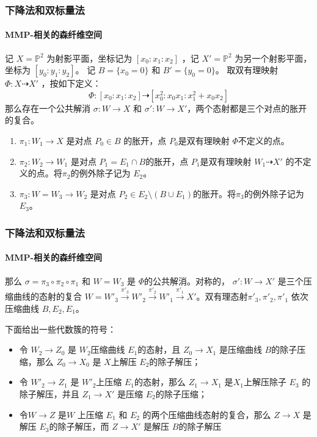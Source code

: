\documentclass[10pt]{ctexbeamer}
\begin{document}
\begin{frame}[shrink]
  \frametitle{下降法和双标量法}
  \framesubtitle{MMP-相关的森纤维空间}
记 $ X=\mathbb{P}^2 $ 为射影平面，坐标记为 $ [ x_0:x_1:x_2 ] $ ，记 $ X'=\mathbb{P}^2 $ 为另一个射影平面，坐标为 $ [ y_0:y_1:y_2 ] $。
记 $ B=\{x_0=0\} $ 和 $B'=\{y_{0}=0\} $。
取双有理映射 $ \Phi:X\dashrightarrow X' $ ，按如下定义：
\[ \Phi:[x_0:x_1:x_2]\dashrightarrow [x_0^2:x_0x_1:x_1^2+x_0x_2] \]
那么存在一个公共解消 $\sigma: W\to X$ 和 $\sigma':W\to X'$，两个态射都是三个对点的胀开的复合。

  \pause
\begin{enumerate}
  \item $\pi_{1}:W_{1}\to X$ 是对点 $P_{0} \in B$ 的胀开，点 $P_{0}$是双有理映射  $\Phi$不定义的点。
  \item $\pi_{2}:W_{2}\to W_{1}$ 是对点 $P_{1}=E_{1} \cap B$的胀开，点 $P_{1}$是双有理映射 $  W_{1}\dashrightarrow X' $
的不定义的点。将$\pi_{2}$的例外除子记为 $E_{2}$。
  \item $\pi_{3}:W=W_{3}\to W_{2}$ 是对点 $P_{2} \in E_{2} \setminus (B\cup E_{1})$的胀开。将$\pi_{3}$的例外除子记为 $E_{3}$。
\end{enumerate}
\end{frame}

\begin{frame}[shrink]
  \frametitle{下降法和双标量法}
  \framesubtitle{MMP-相关的森纤维空间}
那么 $ \sigma=\pi_{3}\circ \pi_{2} \circ \pi_{1} $ 和 $ W=W_3 $ 是 $\Phi$的公共解消。对称的， $ \sigma':W\to X' $ 是三个压缩曲线的态射的复合  $W=W'_{3}\xrightarrow{\pi'_{3}} W'_{2}\xrightarrow{\pi'_{2}} W'_{1} \xrightarrow{\pi'_{1}} X'$。双有理态射$\pi'_{3},\pi'_{2},\pi'_{1}$ 依次压缩曲线 $ B,E_2,E_1 $。

  \pause
下面给出一些代数簇的符号：
\begin{itemize}
  \item 令 $W_{2}\to Z_{0}$ 是  $W_{2}$压缩曲线 $E_{1}$的态射，且 $Z_{0} \to X_{1}$ 是压缩曲线 $B$的除子压缩，那么 $Z_{0}\to X_{0}$ 是  $X$上解压 $E_{2}$的除子解压；
  \item 令 $W'_{2}\to Z_{1}$   是 $W'_{2}$上压缩 $E_{1}$的态射，那么 $Z_{1} \to X_{1}$ 是$X_{1}$上解压除子 $E_{3}$ 的除子解压，并且 $Z_{1}\to X'$ 是压缩 $E_{2}$的除子压缩；
  \item 令$W\to Z$ 是$W$ 上压缩  $E_{1}$ 和 $E_{2}$ 的两个压缩曲线态射的复合，那么 $Z\to X$ 是解压 $E_{3}$的除子解压，而 $Z\to X'$ 是解压 $B$的除子解压
\end{itemize}
\end{frame}
\end{document}
